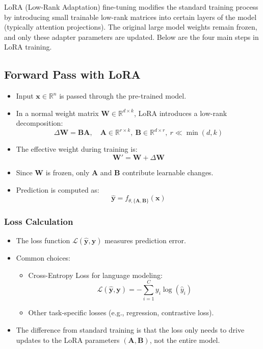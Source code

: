 LoRA (Low-Rank Adaptation) fine-tuning modifies the standard training process by introducing small trainable low-rank matrices into certain layers of the model (typically attention projections). The original large model weights remain frozen, and only these adapter parameters are updated. Below are the four main steps in LoRA training.

\subsection{Forward Pass with LoRA}

\begin{itemize}
    \item Input $\mathbf{x} \in \mathbb{R}^n$ is passed through the pre-trained model.
    \item In a normal weight matrix $\mathbf{W} \in \mathbb{R}^{d \times k}$, LoRA introduces a low-rank decomposition:
    \[
        \Delta \mathbf{W} = \mathbf{B}\mathbf{A}, \quad \mathbf{A} \in \mathbb{R}^{r \times k}, \ \mathbf{B} \in \mathbb{R}^{d \times r}, \ r \ll \min(d, k)
    \]
    \item The effective weight during training is:
    \[
        \mathbf{W}' = \mathbf{W} + \Delta \mathbf{W}
    \]
    \item Since $\mathbf{W}$ is frozen, only $\mathbf{A}$ and $\mathbf{B}$ contribute learnable changes.
    \item Prediction is computed as:
    \[
        \hat{\mathbf{y}} = f_{\theta,\{\mathbf{A}, \mathbf{B}\}}(\mathbf{x})
    \]
\end{itemize}

\subsubsection{Loss Calculation}

\begin{itemize}
    \item The loss function $\mathcal{L}(\hat{\mathbf{y}}, \mathbf{y})$ measures prediction error.
    \item Common choices:
    \begin{itemize}
        \item Cross-Entropy Loss for language modeling:
        \[
            \mathcal{L}(\hat{\mathbf{y}}, \mathbf{y}) = - \sum_{i=1}^C y_i \log(\hat{y}_i)
        \]
        \item Other task-specific losses (e.g., regression, contrastive loss).
    \end{itemize}
    \item The difference from standard training is that the loss only needs to drive updates to the LoRA parameters $(\mathbf{A}, \mathbf{B})$, not the entire model.
\end{itemize}

